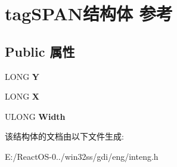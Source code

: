 \hypertarget{structtag_s_p_a_n}{}\section{tag\+S\+P\+A\+N结构体 参考}
\label{structtag_s_p_a_n}
\subsection*{Public 属性}
\begin{DoxyCompactItemize}
\item 
\mbox{\label{structtag_s_p_a_n_ab11cb6875c919f01e7f0d407ccaf2cb5}} 
L\+O\+NG {\bfseries Y}
\item 
\mbox{\label{structtag_s_p_a_n_a64fa7546cefcec471c0ef78172bcf3ed}} 
L\+O\+NG {\bfseries X}
\item 
\mbox{\label{structtag_s_p_a_n_a8877720e8e719a08ea7dd7dee04cf26c}} 
U\+L\+O\+NG {\bfseries Width}
\end{DoxyCompactItemize}


该结构体的文档由以下文件生成\+:\begin{DoxyCompactItemize}
\item 
E\+:/\+React\+O\+S-\/0../win32ss/gdi/eng/inteng.\+h\end{DoxyCompactItemize}
